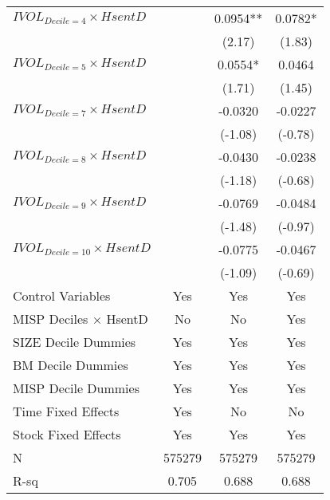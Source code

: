 \begin{tabular}{lccc}
$IVOL_{Decile = 4} \times HsentD$ &         & 0.0954** & 0.0782* \\
        &         & (2.17)  & (1.83) \\
$IVOL_{Decile = 5} \times HsentD$ &         & 0.0554* & 0.0464 \\
        &         & (1.71)  & (1.45) \\
$IVOL_{Decile = 7} \times HsentD$ &         & -0.0320 & -0.0227 \\
        &         & (-1.08) & (-0.78) \\
$IVOL_{Decile = 8} \times HsentD$ &         & -0.0430 & -0.0238 \\
        &         & (-1.18) & (-0.68) \\
$IVOL_{Decile = 9} \times HsentD$ &         & -0.0769 & -0.0484 \\
        &         & (-1.48) & (-0.97) \\
$IVOL_{Decile = 10} \times HsentD$ &         & -0.0775 & -0.0467 \\
        &         & (-1.09) & (-0.69) \\
\midrule
Control Variables & Yes     & Yes     & Yes \\
MISP Deciles $\times$ HsentD & No      & No      & Yes \\
SIZE Decile Dummies & Yes     & Yes     & Yes \\
BM Decile Dummies & Yes     & Yes     & Yes \\
MISP Decile Dummies & Yes     & Yes     & Yes \\
Time Fixed Effects & Yes     & No      & No \\
Stock Fixed Effects & Yes     & Yes     & Yes \\
N       & 575279  & 575279  & 575279 \\
R-sq    & 0.705   & 0.688   & 0.688 \\
\bottomrule
\end{tabular}%
